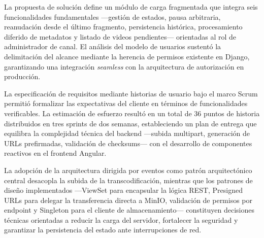 La propuesta de solución define un módulo de carga fragmentada que integra seis funcionalidades 
fundamentales ---gestión de estados, pausa arbitraria, reanudación desde el último fragmento, 
persistencia histórica, procesamiento diferido de metadatos y listado de videos pendientes--- 
orientadas al rol de administrador de canal. El análisis del modelo de usuarios sustentó la 
delimitación del alcance mediante la herencia de permisos existente en Django, garantizando una 
integración \textit{seamless} con la arquitectura de autorización en producción.

La especificación de requisitos mediante historias de usuario bajo el marco Scrum permitió 
formalizar las expectativas del cliente en términos de funcionalidades verificables. La estimación 
de esfuerzo resultó en un total de 36 puntos de historia distribuidos en tres sprints de dos 
semanas, estableciendo un plan de entrega que equilibra la complejidad técnica del backend ---subida 
multipart, generación de URLs prefirmadas, validación de checksums--- con el desarrollo de 
componentes reactivos en el frontend Angular.

La adopción de la arquitectura dirigida por eventos como patrón arquitectónico central desacopla la 
subida de la transcodificación, mientras que los patrones de diseño implementados ---ViewSet para 
encapsular la lógica REST, Presigned URLs para delegar la transferencia directa a MinIO, validación 
de permisos por endpoint y Singleton para el cliente de almacenamiento--- constituyen decisiones 
técnicas orientadas a reducir la carga del servidor, fortalecer la seguridad y garantizar la 
persistencia del estado ante interrupciones de red.